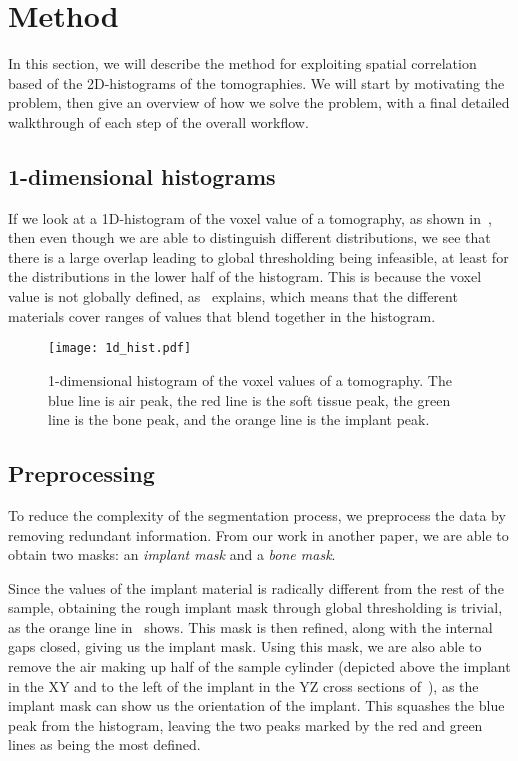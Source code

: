 \section{Method}\label{sec:method}
In this section, we will describe the method for exploiting spatial correlation based of the 2D-histograms of the tomographies.
We will start by motivating the problem, then give an overview of how we solve the problem, with a final detailed walkthrough of each step of the overall workflow.

\subsection{1-dimensional histograms}
If we look at a 1D-histogram of the voxel value of a tomography, as shown in~, then even though we are able to distinguish different distributions, we see that there is a large overlap leading to global thresholding being infeasible, at least for the distributions in the lower half of the histogram.
This is because the voxel value is not globally defined, as~ explains, which means that the different materials cover ranges of values that blend together in the histogram.

\begin{figure}
    \centering
    \texttt{[image: 1d\_hist.pdf]}
    \caption{1-dimensional histogram of the voxel values of a tomography. The blue line is air peak, the red line is the soft tissue peak, the green line is the bone peak, and the orange line is the implant peak.}
    \label{fig:1d-hist}
\end{figure}

\subsection{Preprocessing}\label{sec:preprocess}
To reduce the complexity of the segmentation process, we preprocess the data by removing redundant information.
From our work in another paper, we are able to obtain two masks: an \textit{implant mask} and a \textit{bone mask}.

Since the values of the implant material is radically different from the rest of the sample, obtaining the rough implant mask through global thresholding is trivial, as the orange line in~ shows.
This mask is then refined, along with the internal gaps closed, giving us the implant mask. 
Using this mask, we are also able to remove the air making up half of the sample cylinder (depicted above the implant in the XY and to the left of the implant in the YZ cross sections of~), as the implant mask can show us the orientation of the implant. This squashes the blue peak from the histogram, leaving the two peaks marked by the red and green lines as being the most defined. 

